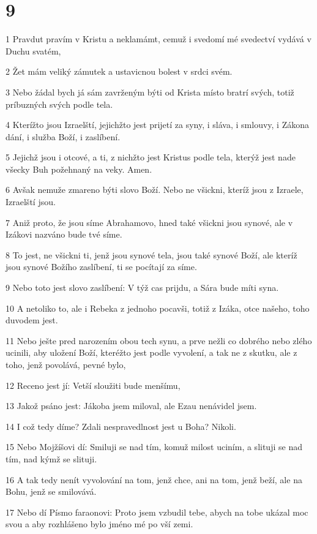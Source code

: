 \chapter{9}

\par 1 Pravdut pravím v Kristu a neklamámt, cemuž i svedomí mé svedectví vydává v Duchu svatém,
\par 2 Žet mám veliký zámutek a ustavicnou bolest v srdci svém.
\par 3 Nebo žádal bych já sám zavrženým býti od Krista místo bratrí svých, totiž príbuzných svých podle tela.
\par 4 Kterížto jsou Izraelští, jejichžto jest prijetí za syny, i sláva, i smlouvy, i Zákona dání, i služba Boží, i zaslíbení.
\par 5 Jejichž jsou i otcové, a ti, z nichžto jest Kristus podle tela, kterýž jest nade všecky Buh požehnaný na veky. Amen.
\par 6 Avšak nemuže zmareno býti slovo Boží. Nebo ne všickni, kteríž jsou z Izraele, Izraelští jsou.
\par 7 Aniž proto, že jsou síme Abrahamovo, hned také všickni jsou synové, ale v Izákovi nazváno bude tvé síme.
\par 8 To jest, ne všickni ti, jenž jsou synové tela, jsou také synové Boží, ale kteríž jsou synové Božího zaslíbení, ti se pocítají za síme.
\par 9 Nebo toto jest slovo zaslíbení: V týž cas prijdu, a Sára bude míti syna.
\par 10 A netoliko to, ale i Rebeka z jednoho pocavši, totiž z Izáka, otce našeho, toho duvodem jest.
\par 11 Nebo ješte pred narozením obou tech synu, a prve nežli co dobrého nebo zlého ucinili, aby uložení Boží, kteréžto jest podle vyvolení, a tak ne z skutku, ale z toho, jenž povolává, pevné bylo,
\par 12 Receno jest jí: Vetší sloužiti bude menšímu,
\par 13 Jakož psáno jest: Jákoba jsem miloval, ale Ezau nenávidel jsem.
\par 14 I což tedy díme? Zdali nespravedlnost jest u Boha? Nikoli.
\par 15 Nebo Mojžíšovi dí: Smiluji se nad tím, komuž milost uciním, a slituji se nad tím, nad kýmž se slituji.
\par 16 A tak tedy nenít vyvolování na tom, jenž chce, ani na tom, jenž beží, ale na Bohu, jenž se smilovává.
\par 17 Nebo dí Písmo faraonovi: Proto jsem vzbudil tebe, abych na tobe ukázal moc svou a aby rozhlášeno bylo jméno mé po vší zemi.
